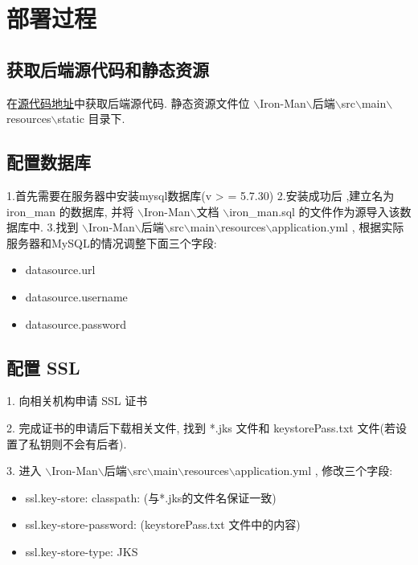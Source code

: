 \chapter{部署过程}

\section{获取后端源代码和静态资源}

在\href{https://github.com/anti-entropy123/Iron-Man/tree/master}{源代码地址}中获取后端源代码. 静态资源文件位 $\backslash$Iron-Man$\backslash$后端$\backslash$src$\backslash$main$\backslash$resources$\backslash$static 目录下.

\section{配置数据库}
1.首先需要在服务器中安装mysql数据库(v > = 5.7.30)
2.安装成功后 ,建立名为 iron\_man 的数据库, 并将 $\backslash$Iron-Man$\backslash$文档 $\backslash$iron\_man.sql 的文件作为源导入该数据库中.
3.找到 $\backslash$Iron-Man$\backslash$后端$\backslash$src$\backslash$main$\backslash$resources$\backslash$application.yml , 根据实际服务器和MySQL的情况调整下面三个字段:
\begin{itemize}
    \item datasource.url
    \item datasource.username
    \item datasource.password
\end{itemize}
 
\section{配置 SSL}
1. 向相关机构申请 SSL 证书

2. 完成证书的申请后下载相关文件, 找到 *.jks 文件和 keystorePass.txt 文件(若设置了私钥则不会有后者).

3. 进入 $\backslash$Iron-Man$\backslash$后端$\backslash$src$\backslash$main$\backslash$resources$\backslash$application.yml , 修改三个字段:

\begin{itemize}
    \item ssl.key-store: classpath: (与*.jks的文件名保证一致)
    \item ssl.key-store-password: (keystorePass.txt 文件中的内容)
    \item ssl.key-store-type: JKS
\end{itemize}

